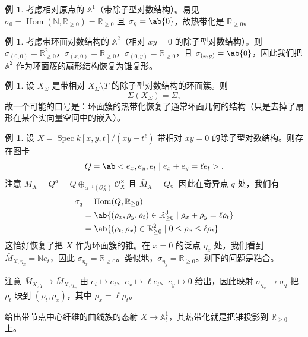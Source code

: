 \documentclass{amsart}
\theoremstyle{definition}
\newtheorem{exm}[thm]{例}
\theoremstyle{remark}
\theoremstyle{plain}
\theoremstyle{definition}
\theoremstyle{remark}
\newcommand{\A}{\mathbb{A}}
\newcommand{\N}{\mathbb{N}}
\newcommand{\R}{\mathbb{R}}
\newcommand{\mc}[1]{\mathcal{#1}}
\newcommand{\1}{\mathbf{1}}
\newcommand{\2}{\mathbf{2}}
\newcommand{\3}{\mathbf{3}}
\DeclareMathOperator{\Hom}{Hom}
\DeclareMathOperator{\Spec}{Spec}
\begin{document}
\begin{exm}
    考虑相对原点的 \(\A^1\)（带除子型对数结构）。易见 \(\sigma_0 = \Hom(\N, \R_{\geq 0}) = \R_{\geq 0}\) 且 \(\sigma_{\eta} = \ab\{0\}\)，故热带化是 \(\R_{\geq 0}\)。
\end{exm}

\begin{exm}
    考虑带环面对数结构的 \(\A^2\)（相对 \(xy = 0\) 的除子型对数结构）。则 \(\sigma_{(0,0)} = \R^2_{\geq 0}\)，\(\sigma_{(x,0)} = \R_{\geq 0}\)，\(\sigma_{(0,y)} = \R_{\geq 0}\)，且 \(\sigma_{(x,y)} = \ab\{0\}\)，因此我们把 \(\A^2\) 作为环面簇的扇形结构恢复为锥复形。
\end{exm}

\begin{exm}
    设 \(X_{\Sigma}\) 是带相对 \(X_{\Sigma} \setminus T\) 的除子型对数结构的环面簇。则
    \[ \Sigma(X_{\Sigma}) = \Sigma, \]
    故一个可能的口号是：环面簇的热带化恢复了通常环面几何的结构（只是去掉了扇形在某个实向量空间中的嵌入）。
\end{exm}

\begin{exm}
    设 \(X = \Spec k[x,y,t]/(xy-t^{\ell})\) 带相对 \(xy = 0\) 的除子型对数结构。则存在图卡
    \[ Q = \ab<e_x, e_y, e_t \mid e_x + e_y = \ell e_t>. \]
    注意 \(M_X = Q^a = Q \oplus_{\alpha^{-1}(\mc{O}_X^{\times})} \mc{O}_X^{\times}\) 且 \(\bar{M}_X = Q\)。因此在奇异点 \(q\) 处，我们有
    \begin{align*}
        \sigma_q &= \Hom(Q, \R_{\geq 0}) \\
        &= \ab\{ (\rho_x, \rho_y, \rho_t) \in \R_{\geq 0}^3 \mid \rho_x + \rho_y = \ell \rho_t \} \\
        &= \ab\{ (\rho_t, \rho_x) \in \R_{\geq 0}^2 \mid 0 \leq \rho_x \leq \ell \rho_t \}
    \end{align*}
    这恰好恢复了把 \(X\) 作为环面簇的锥。在 \(x = 0\) 的泛点 \(\eta_x\) 处，我们看到 \(\bar{M}_{X, \eta_x} = \N e_t\)，因此 \(\sigma_{\eta_x} = \R_{\geq 0}\)。类似地，\(\sigma_{\eta_y} = \R_{\geq 0}\)。剩下的问题是粘合。

    注意 \(\bar{M}_{X, q} \to \bar{M}_{X, \eta_x}\) 由 \(e_t \mapsto e_t\)、\(e_x \mapsto \ell e_t\)、\(e_y \mapsto 0\) 给出，因此映射 \(\sigma_{\eta_x} \to \sigma_q\) 把 \(\rho_t\) 映到 \((\rho_t, \rho_x)\)，其中 \(\rho_x = \ell \rho_t\)。

    给出带节点中心纤维的曲线族的态射 \(X \to \A^1_t\)，其热带化就是把锥投影到 \(\R_{\geq 0}\) 上。
\end{exm}
\end{document}
